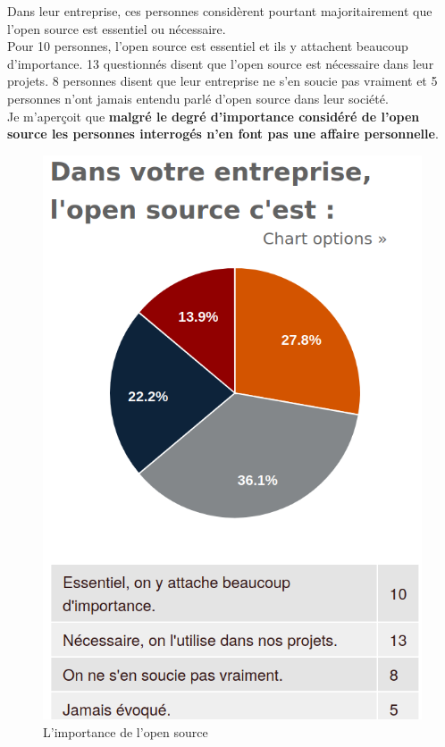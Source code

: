			Dans leur entreprise, ces personnes considèrent pourtant majoritairement que l'open source est essentiel ou nécessaire.\\

			Pour 10 personnes, l'open source est essentiel et ils y attachent beaucoup d'importance.
			13 questionnés disent que l'open source est nécessaire dans leur projets. 8 personnes disent que leur entreprise ne s'en soucie pas vraiment et 5 personnes n'ont jamais entendu parlé d'open source dans leur société.\\


			Je m'aperçoit que \textbf{malgré le degré d'importance considéré de l'open source les personnes interrogés n'en font pas une affaire personnelle}.

			\begin{figure}[!htb]
				\center
				\includegraphics[scale=0.28]{./img/importanceos}
				\caption{L'importance de l'open source}					
			\end{figure}


